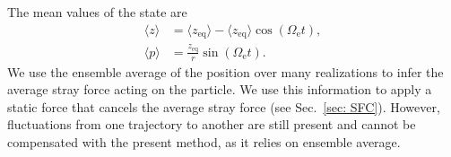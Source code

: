 \documentclass[aps, 
reprint, 
notitlepage,  superscriptaddress, 
onecolumn]{revtex4-1}
\newcommand{\<}{\langle}
\renewcommand{\>}{\rangle}
\newcommand{\Oe}{\Omega_\mathrm{e}}
\begin{document}
The mean values of the state are
\begin{subequations}
\label{eq: mean value}
\begin{align}
    \langle z \rangle &= \langle z_\mathrm{eq}\rangle -\langle z_\mathrm{eq}\rangle\cos(\Oe t), \\
    \langle p \rangle &= \frac{z_\mathrm{eq}}{r} \sin(\Oe t).
    \end{align}
\end{subequations}
We use the ensemble average of the position over many realizations to infer the average stray force acting on the particle.
%
We use this information to apply a static force that cancels the average stray force (see Sec.~\ref{sec: SFC}).
%
However, fluctuations from one trajectory to another are still present and cannot be compensated with the present method, as it relies on ensemble average.
\end{document}
